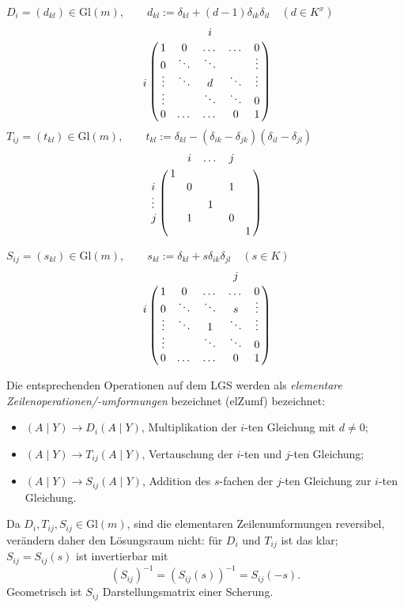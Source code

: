  	$ D_i = (d_{kl})\in \mathrm{Gl}(m), \qquad
 	d_{kl} := \delta_{kl}+(d-1)\delta_{ik}\delta_{il}\quad (d\in K^x) $
 	\[
 		\bordermatrix{
 			&   &   & i & &\cr
 			& 1 & 0 & \dots & \dots & 0\cr
 			& 0 & \ddots & \ddots &   & \vdots \cr
 			i & \vdots & \ddots & d & \ddots & \vdots \cr
 			& \vdots &   &  \ddots & \ddots & 0 \cr
 			& 0 &  \dots & \dots  & 0 & 1 \cr
 		}
 	\]
 	$ T_{ij} = (t_{kl})\in \mathrm{Gl}(m), \qquad
 	t_{kl} := \delta_{kl}-(\delta_{ik}-\delta_{jk})(\delta_{il}-\delta_{jl})$
 	\[
 		\bordermatrix{
 			&        & i      & \dots  & j     &         \cr
 			& 1      &        &        &       &         \cr
 			i     &        & 0      &        & 1     &         \cr
 			\vdots&        &        & 1      &       &         \cr
 			j     &        & 1      &        & 0     &         \cr
 			&        &        &        &       & 1       \cr
 		}
 	\]

 	$ S_{ij}=(s_{kl})\in \mathrm{Gl}(m), \qquad
 	s_{kl} := \delta_{kl}+s\delta_{ik}\delta_{jl} \quad (s\in K)$
 	\[
 		\bordermatrix{
 			&   &   &  & j &\cr
 			& 1 & 0 & \dots & \dots & 0\cr
 			i & 0 & \ddots & \ddots & s & \vdots \cr
 			& \vdots & \ddots & 1 & \ddots & \vdots \cr
 			& \vdots &   &  \ddots & \ddots & 0 \cr
 			& 0 &  \dots & \dots  & 0 & 1 \cr
 		}
 	\]

 	Die entsprechenden Operationen auf dem LGS werden als \emph{elementare Zeilenoperationen/-umformungen} bezeichnet (elZumf) bezeichnet:
 	\begin{itemize}
 		\item $ (A\mid Y) \to D_i (A\mid Y) $, Multiplikation der $ i $-ten Gleichung mit $ d\neq 0 $;
 		\item $ (A\mid Y) \to T_{ij} (A\mid Y) $, Vertauschung der $ i $-ten und $ j $-ten Gleichung;
 		\item $ (A\mid Y) \to S_{ij} (A\mid Y)$, Addition des $ s $-fachen der $ j $-ten Gleichung zur $ i $-ten Gleichung.
 	\end{itemize}
 	Da $ D_i,T_{ij},S_{ij}\in \mathrm{Gl}(m) $, sind die elementaren Zeilenumformungen reversibel, verändern daher den Lösungsraum nicht: für $ D_i $ und $ T_{ij} $ ist das klar; $ S_{ij} = S_{ij}(s) $ ist invertierbar mit
 	\[
 		(S_{ij})^{-1} = (S_{ij}(s))^{-1} = S_{ij}(-s).
 	\]
 	Geometrisch ist $ S_{ij} $ Darstellungsmatrix einer Scherung.

